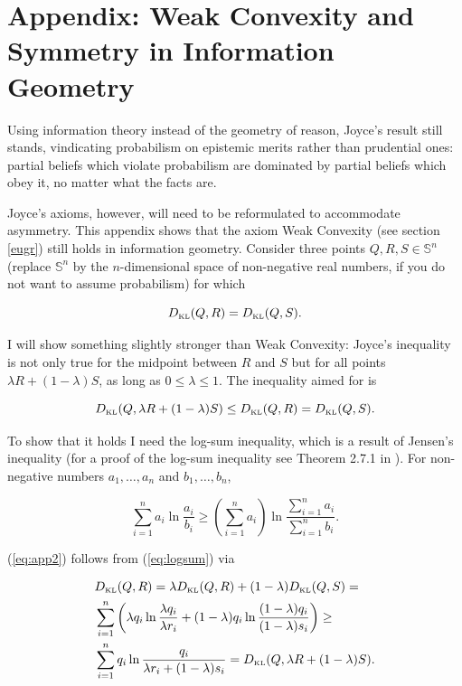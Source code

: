 \documentclass[11pt]{article}
\begin{document}
\appendix

\section{Appendix: Weak Convexity and Symmetry in Information Geometry}
\label{app:wcs}

Using information theory instead of the geometry of reason, Joyce's
result still stands, vindicating probabilism on epistemic merits
rather than prudential ones: partial beliefs which violate probabilism
are dominated by partial beliefs which obey it, no matter what the
facts are.

Joyce's axioms, however, will need to be reformulated to accommodate
asymmetry. This appendix shows that the axiom Weak Convexity (see
section \ref{eugr}) still holds in information geometry. Consider
three points $Q,R,S\in\mathbb{S}^{n}$ (replace $\mathbb{S}^{n}$ by the
$n$-dimensional space of non-negative real numbers, if you do not want
to assume probabilism) for which

\begin{equation}
  \label{eq:app1}
  D_{\mbox{\tiny KL}}(Q,R)=D_{\mbox{\tiny KL}}(Q,S).
\end{equation}

I will show something slightly stronger than Weak Convexity: Joyce's
inequality is not only true for the midpoint between $R$ and $S$ but
for all points $\lambda{}R+(1-\lambda)S$, as long as
$0\leq\lambda\leq{}1$. The inequality aimed for is

\begin{equation}
  \label{eq:app2}
  D_{\mbox{\tiny KL}}(Q,\lambda{}R+(1-\lambda)S)\leq{}D_{\mbox{\tiny KL}}(Q,R)=D_{\mbox{\tiny KL}}(Q,S).
\end{equation}

To show that it holds I need the log-sum inequality, which is a result
of Jensen's inequality (for a proof of the log-sum inequality see
Theorem 2.7.1 in ). For non-negative
numbers $a_{1},\ldots,a_{n}$ and $b_{1},\ldots,b_{n}$,

\begin{equation}
  \label{eq:logsum}
  \sum_{i=1}^{n}a_{i}\ln\frac{a_{i}}{b_{i}}\geq\left(\sum_{i=1}^{n}a_{i}\right)\ln\frac{\sum_{i=1}^{n}a_{i}}{\sum_{i=1}^{n}b_{i}}.
\end{equation}

(\ref{eq:app2}) follows from (\ref{eq:logsum}) via

\begin{align}
  \label{eq:app3}
  &D_{\mbox{\tiny KL}}(Q,R)=\lambda{}D_{\mbox{\tiny KL}}(Q,R)+(1-\lambda)D_{\mbox{\tiny KL}}(Q,S)=\notag \\
  &\sum_{i=1}^{n}\left(\lambda{}q_{i}\ln\frac{\lambda{}q_{i}}{\lambda{}r_{i}}+(1-\lambda)q_{i}\ln\frac{(1-\lambda)q_{i}}{(1-\lambda)s_{i}}\right)\geq\notag \\
  &\sum_{i=1}^{n}q_{i}\ln\frac{q_{i}}{\lambda{}r_{i}+(1-\lambda)s_{i}}=D_{\mbox{\tiny KL}}(Q,\lambda{}R+(1-\lambda)S).
\end{align}
\end{document}
